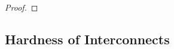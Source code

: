 \begin{proof}
%
  


%  
\end{proof}



\subsection{Hardness of Interconnects}\label{ssec:fprscc}


